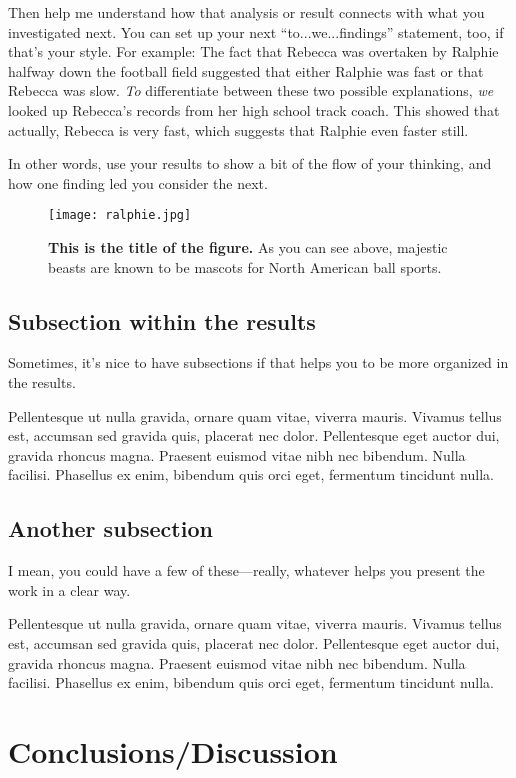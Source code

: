\documentclass[10pt,twocolumn,superscriptaddress,notitlepage]{revtex4-1}
\begin{document}
Then help me understand how that analysis or result connects with what you investigated next. You can set up your next ``to...we...findings'' statement, too, if that's your style. For example: The fact that Rebecca was overtaken by Ralphie halfway down the football field suggested that either Ralphie was fast or that Rebecca was slow. {\it To} differentiate between these two possible explanations, {\it we} looked up Rebecca's records from her high school track coach. This showed that actually, Rebecca is very fast, which suggests that Ralphie even faster still. 

In other words, use your results to show a bit of the flow of your thinking, and how one finding led you consider the next. 

\begin{figure}[t]
	\centering
	\texttt{[image: ralphie.jpg]}
	\caption{
	{\bf This is the title of the figure.}
	As you can see above, majestic beasts are known to be mascots for North American ball sports.
	}
	\label{figure1}
\end{figure}

\subsection{Subsection within the results}
Sometimes, it's nice to have subsections if that helps you to be more organized in the results. 

Pellentesque ut nulla gravida, ornare quam vitae, viverra mauris. Vivamus tellus est, accumsan sed gravida quis, placerat nec dolor. Pellentesque eget auctor dui, gravida rhoncus magna. Praesent euismod vitae nibh nec bibendum. Nulla facilisi. Phasellus ex enim, bibendum quis orci eget, fermentum tincidunt nulla. 

\subsection{Another subsection}
I mean, you could have a few of these---really, whatever helps you present the work in a clear way. 

Pellentesque ut nulla gravida, ornare quam vitae, viverra mauris. Vivamus tellus est, accumsan sed gravida quis, placerat nec dolor. Pellentesque eget auctor dui, gravida rhoncus magna. Praesent euismod vitae nibh nec bibendum. Nulla facilisi. Phasellus ex enim, bibendum quis orci eget, fermentum tincidunt nulla. 

\section{Conclusions/Discussion}
\end{document}
